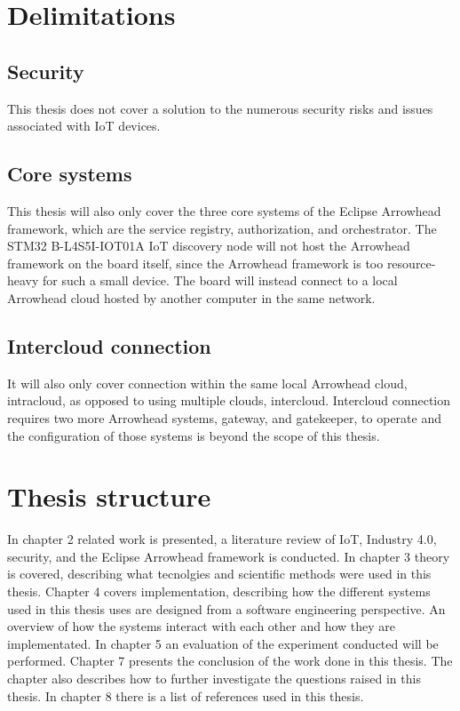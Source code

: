 \section{Delimitations}
\subsection{Security}
This thesis does not cover a solution to the numerous security risks and issues associated with IoT devices. 
\subsection{Core systems}
This thesis will also only cover the three core systems of the Eclipse Arrowhead framework, which are the service registry, authorization, and orchestrator. 
The STM32 B-L4S5I-IOT01A IoT discovery node will not host the Arrowhead framework on the board itself, since the Arrowhead framework is too resource-heavy for such a small device.
The board will instead connect to a local Arrowhead cloud hosted by another computer in the same network. 
\subsection{Intercloud connection}
It will also only cover connection within the same local Arrowhead cloud, intracloud, as opposed to using multiple clouds, intercloud.
Intercloud connection requires two more Arrowhead systems, gateway, and gatekeeper, to operate and the configuration of those systems is beyond the scope of this thesis.
\section{Thesis structure}
In chapter 2 related work is presented, a literature review of IoT, Industry 4.0, security, and the Eclipse Arrowhead framework is conducted. 
In chapter 3 theory is covered, describing what tecnolgies and scientific methods were used in this thesis.
Chapter 4 covers implementation, describing how the different systems used in this thesis uses are designed from a software engineering perspective.
An overview of how the systems interact with each other and how they are implementated.
In chapter 5 an evaluation of the experiment conducted will be performed. 
Chapter 7 presents the conclusion of the work done in this thesis. The chapter also describes how to further investigate the questions raised in this thesis. 
In chapter 8  there is a list of references used in this thesis.
